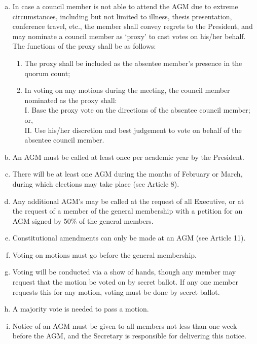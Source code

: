 \documentclass[]{report}
\begin{document}
\begin{enumerate}
\begin{enumerate}[i.]
\begin{enumerate}[(a)]
							\color{red}
						\item In case a council member is not able to attend the AGM due to extreme circumstances, including but not limited to illness, thesis presentation, conference travel, etc., the member shall convey regrets to the President, and may nominate a council member as `proxy' to cast votes on his/her behalf. The functions of the proxy shall be as follows:
							\begin{enumerate}[(1)]
								\item The proxy shall be included as the absentee member's presence in the quorum count; 
								\item In voting on any motions during the meeting, the council member nominated as the proxy shall:\\
									  I. \space Base the proxy vote on the directions of the absentee council member; or,\\
									  II. Use his/her discretion and best judgement to vote on behalf of the absentee council member.
							\end{enumerate}
							 \color{black}
						\item An AGM must be called at least once per academic year by the President.
						\item There will be at least one AGM during the months of February or March, during which elections may take place (see Article 8). 
						\item Any additional AGM's may be called at the request of all Executive, or at the request of a member of the general membership with a petition for an AGM signed by 50\% of the general members.
						\item Constitutional amendments can only be made at an AGM (see Article 11).
						\item Voting on motions must go before the general membership.
						\item Voting will be conducted via a show of hands, though any member may request that the motion be voted on by secret ballot. If any one member requests this for any motion, voting must be done by secret ballot.
						\item A majority vote \color{red}{of those present and voting} \color{black} is needed to pass a motion.
						\item Notice of an AGM must be given to all members not less than one week before the AGM, and the Secretary is responsible for delivering this notice.
					\end{enumerate}
			\end{enumerate}
			
	\end{enumerate}
\end{document}
